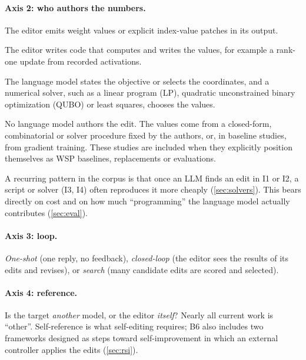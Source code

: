 \paragraph{Axis 2: who authors the numbers.}
\begin{description}[leftmargin=1.2em,itemsep=2pt]
\item[I1 Direct values.] The editor emits weight values or explicit index-value patches in its output.
\item[I2 Program-mediated.] The editor writes code that computes and writes the values, for example a rank-one update from recorded activations.
\item[I3 Solver-mediated.] The language model states the objective or selects the coordinates, and a numerical solver, such as a linear program (LP), quadratic unconstrained binary optimization (QUBO) or least squares, chooses the values.
\item[I4 No LLM.] No language model authors the edit. The values come from a closed-form, combinatorial or solver procedure fixed by the authors, or, in baseline studies, from gradient training. These studies are included when they explicitly position themselves as WSP baselines, replacements or evaluations.
\end{description}
A recurring pattern in the corpus is that once an LLM finds an edit in I1 or I2, a script or solver (I3, I4) often reproduces it more cheaply (\cref{sec:solvers}). This bears directly on cost and on how much ``programming'' the language model actually contributes (\cref{sec:eval}).

\paragraph{Axis 3: loop.} \emph{One-shot} (one reply, no feedback), \emph{closed-loop} (the editor sees the results of its edits and revises), or \emph{search} (many candidate edits are scored and selected).

\paragraph{Axis 4: reference.} Is the target \emph{another} model, or the editor \emph{itself}? Nearly all current work is ``other''. Self-reference is what self-editing requires; B6 also includes two frameworks designed as steps toward self-improvement in which an external controller applies the edits (\cref{sec:rsi}).

